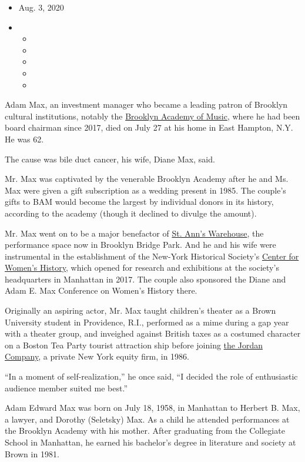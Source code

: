 \begin{itemize}
\item
  Aug. 3, 2020
\item
  \begin{itemize}
  \item
  \item
  \item
  \item
  \item
  \end{itemize}
\end{itemize}

Adam Max, an investment manager who became a leading patron of Brooklyn
cultural institutions, notably the \href{https://www.bam.org/}{Brooklyn
Academy of Music}, where he had been board chairman since 2017, died on
July 27 at his home in East Hampton, N.Y. He was 62.

The cause was bile duct cancer, his wife, Diane Max, said.

Mr. Max was captivated by the venerable Brooklyn Academy after he and
Ms. Max were given a gift subscription as a wedding present in 1985. The
couple's gifts to BAM would become the largest by individual donors in
its history, according to the academy (though it declined to divulge the
amount).

Mr. Max went on to be a major benefactor of
\href{https://stannswarehouse.org/}{St. Ann's Warehouse}, the
performance space now in Brooklyn Bridge Park. And he and his wife were
instrumental in the establishment of the New-York Historical Society's
\href{https://www.nyhistory.org/womens-history}{Center for Women's
History}, which opened for research and exhibitions at the society's
headquarters in Manhattan in 2017. The couple also sponsored the Diane
and Adam E. Max Conference on Women's History there.

Originally an aspiring actor, Mr. Max taught children's theater as a
Brown University student in Providence, R.I., performed as a mime during
a gap year with a theater group, and inveighed against British taxes as
a costumed character on a Boston Tea Party tourist attraction ship
before joining \href{https://www.thejordancompany.com/}{the Jordan
Company}, a private New York equity firm, in 1986.

``In a moment of self-realization,'' he once said, ``I decided the role
of enthusiastic audience member suited me best.''

Adam Edward Max was born on July 18, 1958, in Manhattan to Herbert B.
Max, a lawyer, and Dorothy (Seletsky) Max. As a child he attended
performances at the Brooklyn Academy with his mother. After graduating
from the Collegiate School in Manhattan, he earned his bachelor's degree
in literature and society at Brown in 1981.

